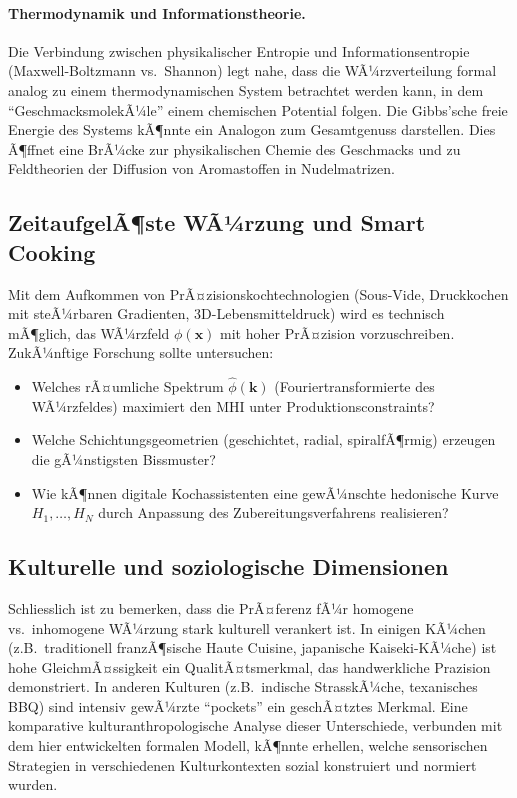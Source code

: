 ﻿\documentclass[12pt,a4paper]{article}
\theoremstyle{definition}
\newcommand{\bx}{\mathbf{x}}
\begin{document}
\paragraph{Thermodynamik und Informationstheorie.}
Die Verbindung zwischen physikalischer Entropie und Informationsentropie
(Maxwell-Boltzmann vs.\ Shannon) legt nahe, dass die WÃ¼rzverteilung
formal analog zu einem thermodynamischen System betrachtet werden kann,
in dem ``GeschmacksmolekÃ¼le'' einem chemischen Potential folgen. Die
Gibbs'sche freie Energie des Systems kÃ¶nnte ein Analogon zum Gesamtgenuss
darstellen. Dies Ã¶ffnet eine BrÃ¼cke zur physikalischen Chemie des
Geschmacks und zu Feldtheorien der Diffusion von Aromastoffen in
Nudelmatrizen.

\subsection{ZeitaufgelÃ¶ste WÃ¼rzung und Smart Cooking}

Mit dem Aufkommen von PrÃ¤zisionskochtechnologien (Sous-Vide,
Druckkochen mit steÃ¼rbaren Gradienten, 3D-Lebensmitteldruck) wird es
technisch mÃ¶glich, das WÃ¼rzfeld $\phi(\bx)$ mit hoher PrÃ¤zision
vorzuschreiben. ZukÃ¼nftige Forschung sollte untersuchen:
\begin{itemize}
  \item Welches rÃ¤umliche Spektrum $\hat{\phi}(\mathbf{k})$ (Fouriertransformierte
    des WÃ¼rzfeldes) maximiert den MHI unter Produktionsconstraints?
  \item Welche Schichtungsgeometrien (geschichtet, radial, spiralfÃ¶rmig)
    erzeugen die gÃ¼nstigsten Bissmuster?
  \item Wie kÃ¶nnen digitale Kochassistenten eine gewÃ¼nschte hedonische
    Kurve $H_1, \ldots, H_N$ durch Anpassung des Zubereitungsverfahrens
    realisieren?
\end{itemize}

\subsection{Kulturelle und soziologische Dimensionen}

Schliesslich ist zu bemerken, dass die PrÃ¤ferenz fÃ¼r homogene vs.\
inhomogene WÃ¼rzung stark kulturell verankert ist. In einigen KÃ¼chen
(z.B.\ traditionell franzÃ¶sische Haute Cuisine, japanische
Kaiseki-KÃ¼che) ist hohe GleichmÃ¤ssigkeit ein QualitÃ¤tsmerkmal, das
handwerkliche Prazision demonstriert. In anderen Kulturen (z.B.\ indische
StrasskÃ¼che, texanisches BBQ) sind intensiv gewÃ¼rzte ``pockets'' ein
geschÃ¤tztes Merkmal. Eine komparative kulturanthropologische Analyse
dieser Unterschiede, verbunden mit dem hier entwickelten formalen Modell,
kÃ¶nnte erhellen, welche sensorischen Strategien in verschiedenen
Kulturkontexten sozial konstruiert und normiert wurden.
\end{document}
